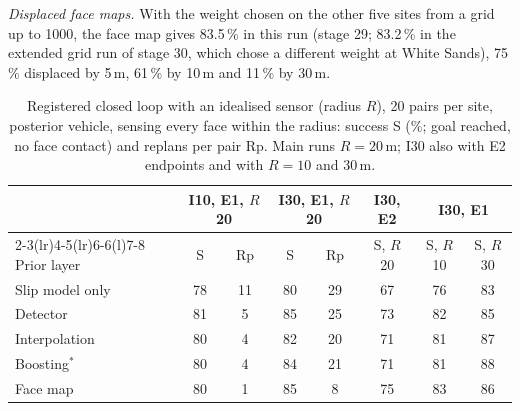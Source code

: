 \documentclass[10pt]{article}
\begin{document}
\textit{Displaced face maps.} With the weight chosen on the other five sites from a grid up to 1000, the face map gives 83.5\,\% in this run (stage 29; 83.2\,\% in the extended grid run of stage 30, which chose a different weight at White Sands), 75\,\% displaced by 5\,m, 61\,\% by 10\,m and 11\,\% by 30\,m.

\begin{table}[H]
\caption{Registered closed loop with an idealised sensor (radius $R$), 20 pairs per site, posterior vehicle, sensing every face within the radius: success S (\%; goal reached, no face contact) and replans per pair Rp. Main runs $R=20$\,m; I30 also with E2 endpoints and with $R=10$ and 30\,m.}
\label{tab:closedloop_ideal}
\centering\scriptsize
\setlength{\tabcolsep}{2.4pt}
\begin{tabular}{@{}lccccccc@{}}
\toprule
 & \multicolumn{2}{c}{I10, E1, $R$ 20} & \multicolumn{2}{c}{I30, E1, $R$ 20} & I30, E2 & \multicolumn{2}{c}{I30, E1} \\
\cmidrule(lr){2-3}\cmidrule(lr){4-5}\cmidrule(lr){6-6}\cmidrule(l){7-8}
Prior layer & S & Rp & S & Rp & S, $R$ 20 & S, $R$ 10 & S, $R$ 30 \\
\midrule
Slip model only & 78 & 11 & 80 & 29 & 67 & 76 & 83 \\
Detector & 81 & 5 & 85 & 25 & 73 & 82 & 85 \\
Interpolation & 80 & 4 & 82 & 20 & 71 & 81 & 87 \\
Boosting$^{*}$ & 80 & 4 & 84 & 21 & 71 & 81 & 88 \\
Face map & 80 & 1 & 85 & 8 & 75 & 83 & 86 \\
\bottomrule
\end{tabular}
\end{table}
\end{document}
